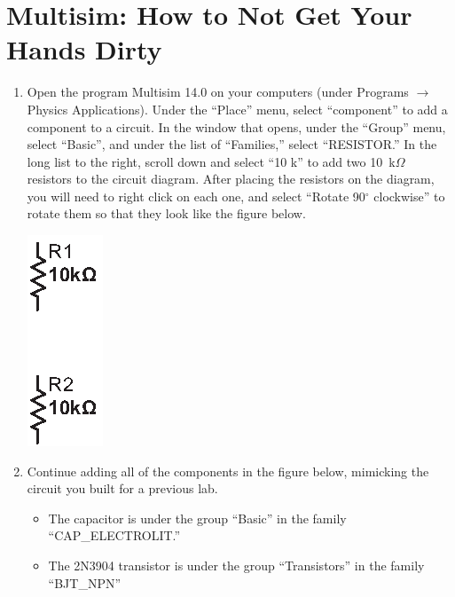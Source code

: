 \section{Multisim: How to Not Get Your Hands Dirty}
\label{lab_multisim}


\bigskip

\begin{enumerate}[wide]

\item Open the program Multisim 14.0 on your computers (under Programs $\longrightarrow$ Physics Applications).  Under the ``Place'' menu, select ``component'' to add a component to a circuit.  In the window that opens, under the ``Group'' menu, select ``Basic'', and under the list of ``Families,'' select ``RESISTOR.''  In the long list to the right, scroll down and select ``10 k'' to add two 10~k$\Omega$ resistors to the circuit diagram.  After placing the resistors on the diagram, you will need to right click on each one, and select ``Rotate 90$^\circ$ clockwise'' to rotate them so that they look like the figure below.
\begin{center}
\includegraphics{multisim/two_resistors.eps}
\end{center}

\item Continue adding all of the components in the figure below, mimicking the circuit you built for a previous lab. 

\begin{itemize}
\item The capacitor is under the group ``Basic'' in the family ``CAP\_ELECTROLIT.''  

\item The 2N3904 transistor is under the group ``Transistors'' in the family ``BJT\_NPN''


\end{itemize}
\end{enumerate}
